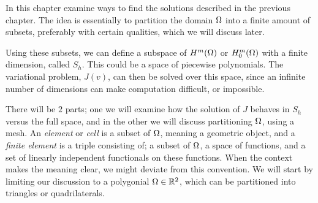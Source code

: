 In this chapter examine ways to find the solutions described in the previous chapter.
The idea is essentially to partition the domain $\Omega$ into a finite amount 
of subsets, preferably with certain qualities, which we will discuss later. 

Using these subsets, we can define a subspace of $H^m(\Omega)$ or $H^m_0(\Omega)$ 
with a finite dimension, called $S_h$. 
This could be a space of piecewise polynomials. 
The variational problem, $J(v)$, can then be 
solved over this space, since an infinite number of dimensions can make 
computation difficult, or impossible.

There will be $2$ parts; one we 
will examine how the solution of $J$ behaves in $S_h$ versus the full space, 
and in the other we will discuss partitioning $\Omega$, using a mesh.
An \emph{element} or \emph{cell} is a 
subset of $\Omega$, meaning a geometric object, 
and a \emph{finite element} is a 
triple consisting of; a subset of $\Omega$, a space of functions, and a set of 
linearly independent functionals on these functions.
When the context makes the meaning clear, we might deviate from 
this convention.
We will start by limiting our discussion to a polygonial $\Omega \in \mathbb{R}^2$, which 
can be partitioned into triangles or quadrilaterals.